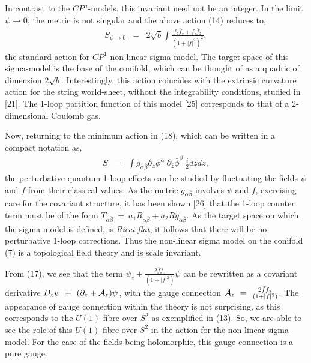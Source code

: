 \documentclass[a4paper,12pt]{article}
\begin{document}
{{In contrast
to the $CP^n$-models, this invariant need not be an integer. In the limit
$\psi \rightarrow 0$, the metric
is not singular and the above action (14) reduces to,  
\begin{eqnarray}
S_{\psi \rightarrow 0}&=& 2\sqrt{b}\int \frac{f_z{\bar{f}}_{\bar{z}}+f_
{\bar{z}}{\bar{f}}_z}{(1+|f|^2)^2},
\end{eqnarray}
the standard action for $CP^1$ non-linear sigma model. The target space of 
this sigma-model is the base of the conifold, which can be thought of as a
quadric of dimension $2\sqrt{b}$. Interestingly, this action coincides with 
 the extrinsic curvature action for the string world-sheet,  
 without the integrability conditions, studied in [21]. The 1-loop 
partition function of this model [25] corresponds to that of a 2-dimensional
Coulomb gas. 

\vspace{0.5cm}

Now, returning to the minimum action in (18), which can be written in a 
compact notation as,
\begin{eqnarray}
S&=& \int g_{\alpha \bar{\beta}} {\partial}_z{\phi}^{\alpha}\ {\partial}
_{\bar{z}}{\bar{\phi}}^{\beta}\ \frac{i}{2} dz d\bar{z},
\end{eqnarray}
the perturbative quantum 1-loop effects can be studied by fluctuating the 
fields $\psi$ and $f$ from their classical values. As the metric $g_{\alpha 
\bar{\beta}}$ involves $\psi$ and $f$, exercising care for the covariant 
structure, it has been shown [26] that the 1-loop counter term must be of 
the form $T_{\alpha \bar{\beta}}\ =\ a_1 R_{\alpha \bar{\beta}} + a_2 R 
g_{\alpha \bar{\beta}}$. As the target space on which the sigma model is
defined, is {\it{Ricci flat}}, it follows that there will be no perturbative 
1-loop corrections. Thus the non-linear sigma model on the conifold (7) 
is a topological field theory and is scale invariant.  

\vspace{0.5cm}

From (17), we see that the term 
${\psi}_z+\frac{2\bar{f}f_z}{(1+|f|^2)}\psi$ can be
rewritten as a covariant derivative $D_z\psi \ \equiv \ ({\partial}_z+ {\cal{A
}}_z)\psi$, with the gauge connection ${\cal{A}}_z\ =\ \frac{2\bar{f}f_z}{
(1+|f|^2)}$. The appearance of gauge connection within the theory is not 
surprising, as this corresponds to the $U(1)$ fibre over $S^2$ as exemplified
 in (13). So, we are able to see the role of this $U(1)$ fibre over $S^2$ in the
action for the non-linear sigma model. For the case of the fields being
holomorphic, this gauge connection is a pure gauge.
 
}}
\end{document}
